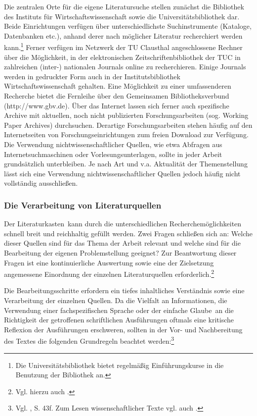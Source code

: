 \documentclass[a4paper, 12pt]{article}
\begin{document}
Die zentralen Orte f\"{u}r die eigene Literatursuche stellen zun\"{a}chst die Bibliothek des
Instituts f\"{u}r Wirtschaftswissenschaft sowie die Universit\"{a}tsbibliothek dar. Beide
Einrichtungen verf\"{u}gen \"{u}ber unterschiedlichste Suchinstrumente (Kataloge,
Datenbanken etc.), anhand derer nach m\"{o}glicher Literatur recherchiert werden
kann.\footnote{Die Universit\"{a}tsbibliothek bietet regelm\"{a}\ss ig Einf\"{u}hrungskurse in die
Benutzung der Bibliothek an.} Ferner verf\"{u}gen im Netzwerk der TU Clausthal
angeschlossene Rechner \"{u}ber die M\"{o}glichkeit, in der elektronischen
Zeitschriftenbibliothek der TUC in zahlreichen (inter-) nationalen Journals online
zu recherchieren. Einige Journals werden in gedruckter Form auch in der
Institutsbibliothek Wirtschaftswissenschaft gehalten. Eine M\"{o}glichkeit zu einer
umfassenderen Recherche bietet die Fernleihe \"{u}ber den Gemeinsamen Bibliotheksverbund
(http://www.gbv.de). \"{U}ber das Internet lassen sich ferner auch spezifische Archive
mit aktuellen, noch nicht publizierten Forschungsarbeiten (sog. \glqq Working Paper
Archives\grqq) durchsuchen. Derartige Forschungsarbeiten stehen h\"{a}ufig auf den
Internetseiten von Forschungseinrichtungen zum freien Download zur Verf\"{u}gung. Die
Verwendung nichtwissenschaftlicher Quellen, wie etwa Abfragen aus
Internetsuchmaschinen oder Vorlesungsunterlagen, sollte in jeder Arbeit
grunds\"{a}tzlich unterbleiben. Je nach Art und v.a. Aktualit\"{a}t der Themenstellung l\"{a}sst
sich eine Verwendung nichtwissenschaftlicher Quellen jedoch h\"{a}ufig nicht vollst\"{a}ndig
ausschlie\ss en.

\subsubsection{Die Verarbeitung von Literaturquellen}

Der \glqq Literaturkasten\grqq\ kann durch die unterschiedlichen
Recherchem\"{o}glichkeiten schnell breit und reichhaltig gef\"{u}llt werden. Zwei Fragen
schlie\ss en sich an: Welche dieser Quellen sind f\"{u}r das Thema der Arbeit relevant und
welche sind f\"{u}r die Bearbeitung der eigenen Problemstellung geeignet? Zur
Beantwortung dieser Fragen ist eine kontinuierliche Auswertung sowie eine der
Zielsetzung angemessene Einordnung der einzelnen Literaturquellen
erforderlich.\footnote{Vgl. hierzu auch \cite{hae2000}.}

Die Bearbeitungsschritte erfordern ein tiefes inhaltliches Verst\"{a}ndnis sowie eine
Verarbeitung der einzelnen Quellen. Da die Vielfalt an Informationen, die Verwendung
einer fachspezifischen Sprache oder der einfache \glqq Glaube\grqq\ an die
Richtigkeit der getroffenen schriftlichen Ausf\"{u}hrungen oftmals eine kritische
Reflexion der Ausf\"{u}hrungen erschweren, sollten in der Vor- und Nachbereitung des
Textes die folgenden Grundregeln beachtet werden:\footnote{Vgl. \cite{koe1988}, S.
43f. Zum Lesen wissenschaftlicher Texte vgl. auch \cite{sch2003}.}
\end{document}
